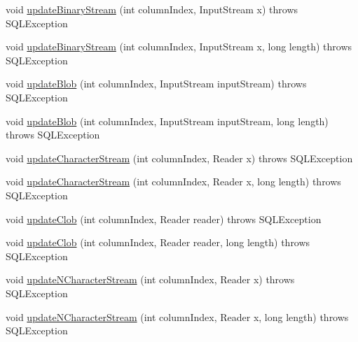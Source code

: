 \begin{DoxyCompactItemize}
\item 
void \mbox{\hyperlink{classcom_1_1mysql_1_1cj_1_1jdbc_1_1result_1_1_updatable_result_set_a779f54f0209ebcd662392a49d2973157}{update\+Binary\+Stream}} (int column\+Index, Input\+Stream x)  throws S\+Q\+L\+Exception 
\item 
void \mbox{\hyperlink{classcom_1_1mysql_1_1cj_1_1jdbc_1_1result_1_1_updatable_result_set_a3ad502758fb5864d80ba4817f6b2b03b}{update\+Binary\+Stream}} (int column\+Index, Input\+Stream x, long length)  throws S\+Q\+L\+Exception 
\item 
void \mbox{\hyperlink{classcom_1_1mysql_1_1cj_1_1jdbc_1_1result_1_1_updatable_result_set_a8f51d67dba1ac190205c03e0dc562b47}{update\+Blob}} (int column\+Index, Input\+Stream input\+Stream)  throws S\+Q\+L\+Exception 
\item 
void \mbox{\hyperlink{classcom_1_1mysql_1_1cj_1_1jdbc_1_1result_1_1_updatable_result_set_a9efda66453df8e106f3452d486d860eb}{update\+Blob}} (int column\+Index, Input\+Stream input\+Stream, long length)  throws S\+Q\+L\+Exception 
\item 
void \mbox{\hyperlink{classcom_1_1mysql_1_1cj_1_1jdbc_1_1result_1_1_updatable_result_set_aff6bc276e21865222e111a22bc1266cd}{update\+Character\+Stream}} (int column\+Index, Reader x)  throws S\+Q\+L\+Exception 
\item 
void \mbox{\hyperlink{classcom_1_1mysql_1_1cj_1_1jdbc_1_1result_1_1_updatable_result_set_a153e59a30b1f1c677dc79d0acf166e60}{update\+Character\+Stream}} (int column\+Index, Reader x, long length)  throws S\+Q\+L\+Exception 
\item 
void \mbox{\hyperlink{classcom_1_1mysql_1_1cj_1_1jdbc_1_1result_1_1_updatable_result_set_a3f3ba97c6780a2b1b9e1830e08109938}{update\+Clob}} (int column\+Index, Reader reader)  throws S\+Q\+L\+Exception 
\item 
void \mbox{\hyperlink{classcom_1_1mysql_1_1cj_1_1jdbc_1_1result_1_1_updatable_result_set_a0c2416b43741ac338e25cccd4ad633a4}{update\+Clob}} (int column\+Index, Reader reader, long length)  throws S\+Q\+L\+Exception 
\item 
void \mbox{\hyperlink{classcom_1_1mysql_1_1cj_1_1jdbc_1_1result_1_1_updatable_result_set_ab0a18f810c2995106d77faf4c072cd04}{update\+N\+Character\+Stream}} (int column\+Index, Reader x)  throws S\+Q\+L\+Exception 
\item 
void \mbox{\hyperlink{classcom_1_1mysql_1_1cj_1_1jdbc_1_1result_1_1_updatable_result_set_aa685d17d86468a2cf83b5b8a3a5f5fa0}{update\+N\+Character\+Stream}} (int column\+Index, Reader x, long length)  throws S\+Q\+L\+Exception 

\end{DoxyCompactItemize}
